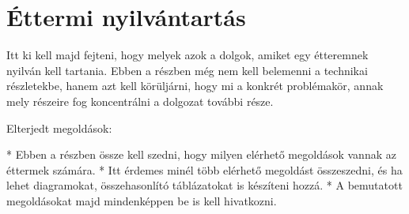 \chapter{Éttermi nyilvántartás}

Itt ki kell majd fejteni, hogy melyek azok a dolgok, amiket egy étteremnek nyilván kell tartania. Ebben a részben még nem kell belemenni a technikai részletekbe, hanem azt kell körüljárni, hogy mi a konkrét problémakör, annak mely részeire fog koncentrálni a dolgozat további része.

Elterjedt megoldások:

* Ebben a részben össze kell szedni, hogy milyen elérhető megoldások vannak az éttermek számára.
* Itt érdemes minél több elérhető megoldást összeszedni, és ha lehet diagramokat, összehasonlító táblázatokat is készíteni hozzá.
* A bemutatott megoldásokat majd mindenképpen be is kell hivatkozni.
